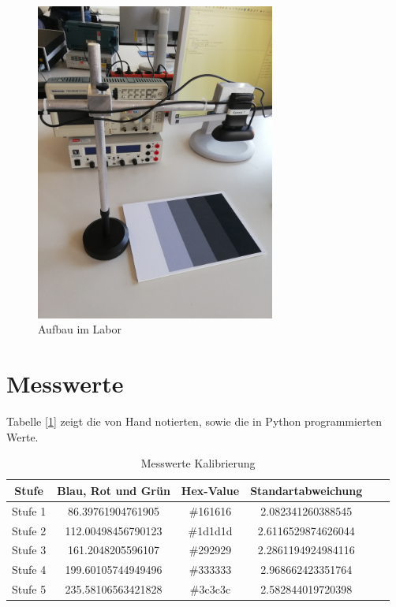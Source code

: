 \documentclass[12pt, oneside, a4paper, \docLanguage]{report}
\begin{document}
\begin{figure}[hbt!]
	\centering\small
	\includegraphics[width=0.7\textwidth]{media/aufbau.jpg}
	\caption{Aufbau im Labor}
	\label{fig:Aufbau im Labor}
\end{figure}
\newpage
\section{Messwerte}
\label{chap:VERSUCH_1_MESSWERTE}
Tabelle [\ref{chap:VERSUCH_1_MESSWERTE}] zeigt die von Hand notierten, sowie die in Python programmierten Werte.

\begin{table}[H]
	\centering\small
	\begin{tabular}{|c|c|c|c|c|c|}
		\hline
		Stufe & Blau, Rot und Grün & Hex-Value & Standartabweichung \\
		\hline
		Stufe 1 & 86.39761904761905 &  \#161616 & 2.082341260388545 \\
		\hline
		Stufe 2 & 112.00498456790123 &  \#1d1d1d & 2.6116529874626044 \\
		\hline
		Stufe 3 & 161.2048205596107 &  \#292929 & 2.2861194924984116 \\
		\hline
		Stufe 4 & 199.60105744949496 &  \#333333 & 2.968662423351764 \\
		\hline
		Stufe 5 & 235.58106563421828 &  \#3c3c3c & 2.582844019720398 \\
		\hline
	\end{tabular}
	\caption{Messwerte Kalibrierung}
	\label{fig:VERSUCH_1_MESSWERTE_TABELLE}
\end{table}
\end{document}
